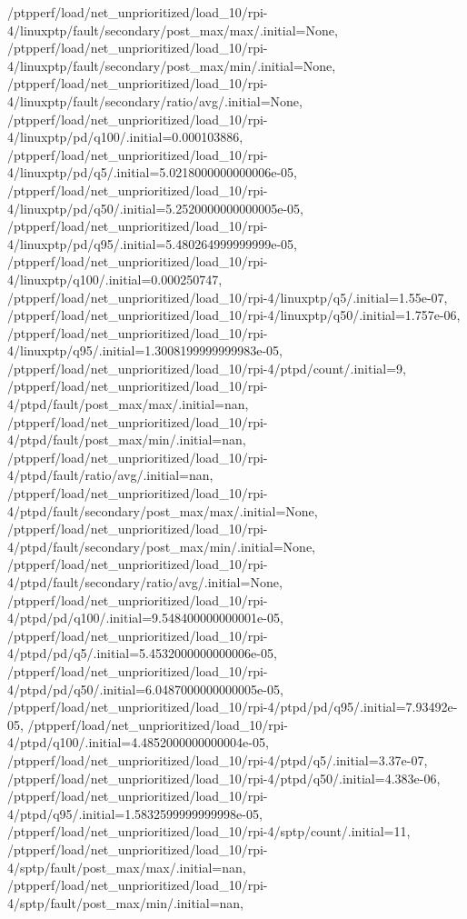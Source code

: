{    /ptpperf/load/net_unprioritized/load_10/rpi-4/linuxptp/fault/secondary/post_max/max/.initial=None,
    /ptpperf/load/net_unprioritized/load_10/rpi-4/linuxptp/fault/secondary/post_max/min/.initial=None,
    /ptpperf/load/net_unprioritized/load_10/rpi-4/linuxptp/fault/secondary/ratio/avg/.initial=None,
    /ptpperf/load/net_unprioritized/load_10/rpi-4/linuxptp/pd/q100/.initial=0.000103886,
    /ptpperf/load/net_unprioritized/load_10/rpi-4/linuxptp/pd/q5/.initial=5.0218000000000006e-05,
    /ptpperf/load/net_unprioritized/load_10/rpi-4/linuxptp/pd/q50/.initial=5.2520000000000005e-05,
    /ptpperf/load/net_unprioritized/load_10/rpi-4/linuxptp/pd/q95/.initial=5.480264999999999e-05,
    /ptpperf/load/net_unprioritized/load_10/rpi-4/linuxptp/q100/.initial=0.000250747,
    /ptpperf/load/net_unprioritized/load_10/rpi-4/linuxptp/q5/.initial=1.55e-07,
    /ptpperf/load/net_unprioritized/load_10/rpi-4/linuxptp/q50/.initial=1.757e-06,
    /ptpperf/load/net_unprioritized/load_10/rpi-4/linuxptp/q95/.initial=1.3008199999999983e-05,
    /ptpperf/load/net_unprioritized/load_10/rpi-4/ptpd/count/.initial=9,
    /ptpperf/load/net_unprioritized/load_10/rpi-4/ptpd/fault/post_max/max/.initial=nan,
    /ptpperf/load/net_unprioritized/load_10/rpi-4/ptpd/fault/post_max/min/.initial=nan,
    /ptpperf/load/net_unprioritized/load_10/rpi-4/ptpd/fault/ratio/avg/.initial=nan,
    /ptpperf/load/net_unprioritized/load_10/rpi-4/ptpd/fault/secondary/post_max/max/.initial=None,
    /ptpperf/load/net_unprioritized/load_10/rpi-4/ptpd/fault/secondary/post_max/min/.initial=None,
    /ptpperf/load/net_unprioritized/load_10/rpi-4/ptpd/fault/secondary/ratio/avg/.initial=None,
    /ptpperf/load/net_unprioritized/load_10/rpi-4/ptpd/pd/q100/.initial=9.548400000000001e-05,
    /ptpperf/load/net_unprioritized/load_10/rpi-4/ptpd/pd/q5/.initial=5.4532000000000006e-05,
    /ptpperf/load/net_unprioritized/load_10/rpi-4/ptpd/pd/q50/.initial=6.0487000000000005e-05,
    /ptpperf/load/net_unprioritized/load_10/rpi-4/ptpd/pd/q95/.initial=7.93492e-05,
    /ptpperf/load/net_unprioritized/load_10/rpi-4/ptpd/q100/.initial=4.4852000000000004e-05,
    /ptpperf/load/net_unprioritized/load_10/rpi-4/ptpd/q5/.initial=3.37e-07,
    /ptpperf/load/net_unprioritized/load_10/rpi-4/ptpd/q50/.initial=4.383e-06,
    /ptpperf/load/net_unprioritized/load_10/rpi-4/ptpd/q95/.initial=1.5832599999999998e-05,
    /ptpperf/load/net_unprioritized/load_10/rpi-4/sptp/count/.initial=11,
    /ptpperf/load/net_unprioritized/load_10/rpi-4/sptp/fault/post_max/max/.initial=nan,
    /ptpperf/load/net_unprioritized/load_10/rpi-4/sptp/fault/post_max/min/.initial=nan,
}
